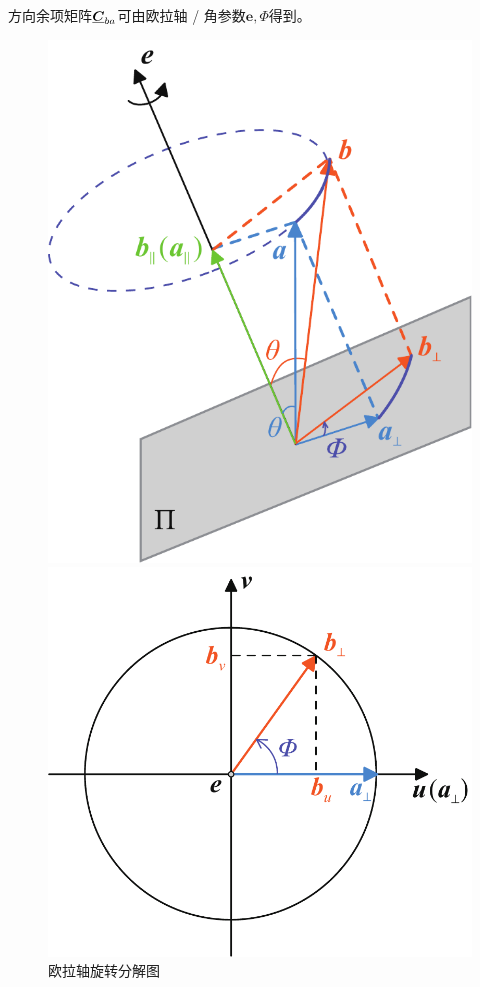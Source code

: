 方向余项矩阵$\underline{\bm{C}}_{ba}$可由欧拉轴 / 角参数$\bm{e}, \varPhi$得到。
\begin{figure}[!htb]
	\begin{minipage}{0.31\linewidth}
		\centering
		\includegraphics[width=0.9\linewidth]{pic/欧拉轴}
		\vspace*{-1.2em}
		\caption{欧拉轴旋转分解图}
		\label{欧拉轴}
	\end{minipage}
	\begin{minipage}{0.348\linewidth}
		\centering
		\includegraphics[width=\linewidth]{pic/欧拉轴2}

\end{minipage}
\end{figure}
